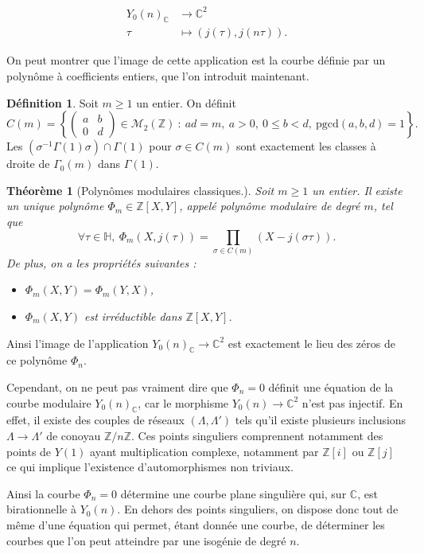 \documentclass[11pt,a4paper]{article}
\newcommand{\Z}{\mathbb{Z}}
\newcommand{\C}{\mathbb{C}}
\renewcommand{\H}{\mathbb{H}}
\newcommand{\M}{\mathcal{M}}
\newcommand{\vers}{\longrightarrow}
\newtheorem*{thm}{Théorème}
\theoremstyle{definition}
\newtheorem*{defi}{Définition}
\begin{document}
$$\begin{aligned}
Y_0(n)_\C &\vers \C^2 \\
 \tau &\longmapsto (j(\tau), j(n\tau)).
\end{aligned}$$

On peut montrer que l'image de cette application est la courbe définie par un polynôme à coefficients entiers, que l'on introduit maintenant.

\begin{defi}
Soit $m\geq 1$ un entier. On définit
$$C(m)=\left\{ 
\left(
\begin{matrix}
a & b \\
0 & d 
\end{matrix}
\right)
\in \M_2(\Z)\ :\ ad=m,\ a>0,\ 0\leq b<d,\ \mathrm{pgcd}(a,b,d)=1\right\}.$$
Les $(\sigma^{-1}\Gamma(1)\sigma)\cap \Gamma(1)$ pour $\sigma\in C(m)$ sont exactement les classes à droite de $\Gamma_0(m)$ dans $\Gamma(1)$.
\end{defi}


\begin{thm}[Polynômes modulaires classiques.]

Soit $m\geq 1$ un entier. Il existe un unique  polynôme $\Phi_m \in \Z[X,Y]$, appelé \emph{polynôme modulaire} de degré $m$, tel que
$$\forall \tau\in\H,\ \Phi_m(X,j(\tau))=\prod_{\sigma\in C(m)} (X-j(\sigma\tau)).$$
De plus, on a les propriétés suivantes :

\begin{itemize}
\item[(i)] $\Phi_m(X,Y)=\Phi_m(Y,X)$,
\item[(ii)] $\Phi_m(X,Y)$ est irréductible dans $\Z[X,Y]$.
\end{itemize}

\end{thm}

Ainsi l'image de l'application $Y_0(n)_\C\vers \C^2$ est exactement le lieu des zéros de ce polynôme $\Phi_n$.

Cependant, on ne peut pas vraiment dire que $\Phi_n=0$ définit une équation de la courbe modulaire $Y_0(n)_\C$, car le morphisme $Y_0(n)\vers \C^2$ n'est pas injectif. En effet, il existe des couples de réseaux $(\Lambda, \Lambda')$ tels qu'il existe plusieurs inclusions $\Lambda\vers\Lambda'$ de conoyau $\Z/n\Z$. Ces points singuliers comprennent notamment des points de $Y(1)$ ayant multiplication complexe, notamment par $\Z[i]$ ou $\Z[j]$ ce qui implique l'existence d'automorphismes non triviaux.

Ainsi la courbe $\Phi_n=0$ détermine une courbe plane singulière qui, sur $\C$, est birationnelle à $Y_0(n)$. En dehors des points singuliers, on dispose donc tout de même d'une équation qui permet, étant donnée une courbe, de déterminer les courbes que l'on peut atteindre par une isogénie de degré $n$.
\end{document}
